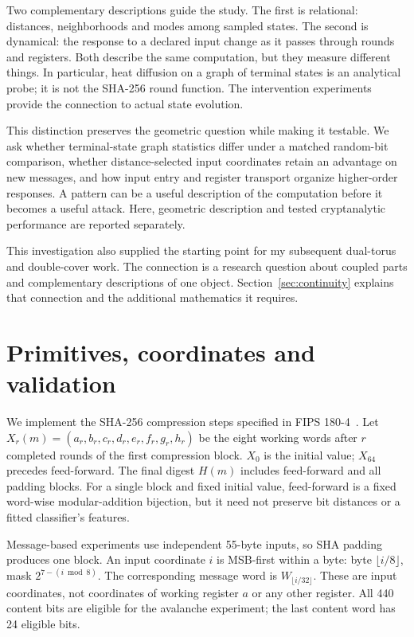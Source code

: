 \documentclass[11pt]{article}
\begin{document}
Two complementary descriptions guide the study. The first is relational: distances, neighborhoods and modes among sampled states. The second is dynamical: the response to a declared input change as it passes through rounds and registers. Both describe the same computation, but they measure different things. In particular, heat diffusion on a graph of terminal states is an analytical probe; it is not the SHA-256 round function. The intervention experiments provide the connection to actual state evolution.

This distinction preserves the geometric question while making it testable. We ask whether terminal-state graph statistics differ under a matched random-bit comparison, whether distance-selected input coordinates retain an advantage on new messages, and how input entry and register transport organize higher-order responses. A pattern can be a useful description of the computation before it becomes a useful attack. Here, geometric description and tested cryptanalytic performance are reported separately.

This investigation also supplied the starting point for my subsequent dual-torus and double-cover work. The connection is a research question about coupled parts and complementary descriptions of one object. Section~\ref{sec:continuity} explains that connection and the additional mathematics it requires.

\section{Primitives, coordinates and validation}
We implement the SHA-256 compression steps specified in FIPS 180-4~\cite{nist}. Let $X_r(m)=(a_r,b_r,c_r,d_r,e_r,f_r,g_r,h_r)$ be the eight working words after $r$ completed rounds of the first compression block. $X_0$ is the initial value; $X_{64}$ precedes feed-forward. The final digest $H(m)$ includes feed-forward and all padding blocks. For a single block and fixed initial value, feed-forward is a fixed word-wise modular-addition bijection, but it need not preserve bit distances or a fitted classifier's features.

Message-based experiments use independent 55-byte inputs, so SHA padding produces one block. An input coordinate $i$ is MSB-first within a byte: byte $\lfloor i/8\rfloor$, mask $2^{7-(i\bmod8)}$. The corresponding message word is $W_{\lfloor i/32\rfloor}$. These are input coordinates, not coordinates of working register $a$ or any other register. All 440 content bits are eligible for the avalanche experiment; the last content word has 24 eligible bits.
\end{document}
